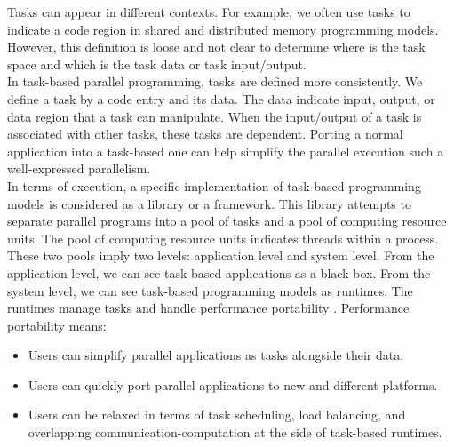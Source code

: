 Tasks can appear in different contexts. For example, we often use tasks to indicate a code region in shared and distributed memory programming models. However, this definition is loose and not clear to determine where is the task space and which is the task data or task input/output.\\

In task-based parallel programming, tasks are defined more consistently. We define a task by a code entry and its data. The data indicate input, output, or data region that a task can manipulate. When the input/output of a task is associated with other tasks, these tasks are dependent. Porting a normal application into a task-based one can help simplify the parallel execution such a well-expressed parallelism.\\

In terms of execution, a specific implementation of task-based programming models is considered as a library or a framework. This library attempts to separate parallel programs into a pool of tasks and a pool of computing resource units. The pool of computing resource units indicates threads within a process. These two pools imply two levels: application level and system level. From the application level, we can see task-based applications as a black box. From the system level, we can see task-based programming models as runtimes. The runtimes manage tasks and handle performance portability \cite{aumage2021taskportability}. Performance portability means:
\begin{itemize}
	\item Users can simplify parallel applications as tasks alongside their data.
	\item Users can quickly port parallel applications to new and different platforms.
	\item Users can be relaxed in terms of task scheduling, load balancing, and overlapping communication-computation at the side of task-based runtimes.
\end{itemize}

%

